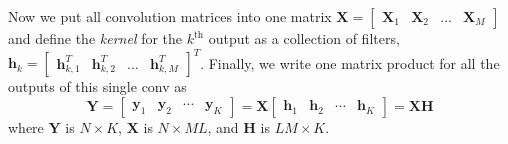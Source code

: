 \documentclass{article}
\begin{document}
Now we put all convolution matrices into one matrix $\bm X = \begin{bmatrix}
\bm X_1^{\phantom{.}} &  \bm X_2^{\phantom{.}} & \ldots & \bm X_M^{\phantom{.}}
\end{bmatrix}
$
and define the \emph{kernel} for the $k^\text{th}$ output as a collection of filters,
$
\bm h_k =
\begin{bmatrix}
\bm h_{k,1}^T & \bm h_{k,2}^T &  \ldots &  \bm h_{k,M}^T
\end{bmatrix}^T
$.
Finally, we write one matrix product for all the outputs of this single \gls{conv} as
\begin{equation}
\bm Y =
\begin{bmatrix}
\bm y_1^{\phantom{.}} & \bm y_2^{\phantom{.}} & \cdots & \bm y_K^{\phantom{.}}
\end{bmatrix}
= \bm X
\begin{bmatrix}
\bm h_{1}^{\phantom{.}} & \bm h_{2}^{\phantom{.}} & \cdots & \bm h_{K}^{\phantom{.}}
\end{bmatrix}
= \bm X \bm H
\label{eq:conv_gemm_mtx}
\end{equation}
where $\bm Y$ is $N\times K$, $\bm X$ is $N\times ML$, and $\bm H$ is $LM\times K$.
\end{document}
